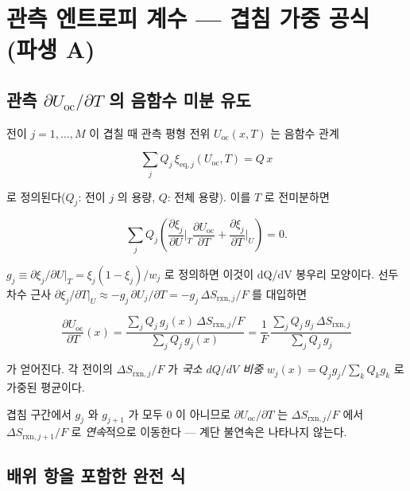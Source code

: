 \documentclass[11pt,a4paper]{article}
\newcommand{\rxn}{\mathrm{rxn}}
\newcommand{\eq}{\mathrm{eq}}
\newcommand{\oc}{\mathrm{oc}}
\begin{document}
\section{관측 엔트로피 계수 — 겹침 가중 공식 (파생 A)}\label{sec:mixing}

\subsection{관측 $\partial U_\oc/\partial T$ 의 음함수 미분 유도}

전이 $j = 1, \ldots, M$ 이 겹칠 때 관측 평형 전위 $U_\oc(x,T)$ 는 음함수 관계

\begin{equation}
  \sum_j Q_j\,\xi_{\eq,j}(U_\oc, T) = Q\,x
  \label{eq:implicit}
\end{equation}

로 정의된다($Q_j$: 전이 $j$ 의 용량, $Q$: 전체 용량). 이를 $T$ 로 전미분하면

\begin{equation}
  \sum_j Q_j\left(\frac{\partial\xi_j}{\partial U}\bigg|_T \frac{\partial U_\oc}{\partial T}
  + \frac{\partial\xi_j}{\partial T}\bigg|_U\right) = 0.
  \label{eq:totalderiv}
\end{equation}

$g_j \equiv \partial\xi_j/\partial U|_T = \xi_j(1-\xi_j)/w_j$ 로 정의하면
이것이 dQ/dV 봉우리 모양이다. 선두 차수 근사
$\partial\xi_j/\partial T|_U \approx -g_j\,\partial U_j/\partial T = -g_j\,\Delta S_{\rxn,j}/F$
를 대입하면

\begin{equation}
  \boxed{\;
    \frac{\partial U_\oc}{\partial T}(x)
    = \frac{\sum_j Q_j\,g_j(x)\,\Delta S_{\rxn,j}/F}{\sum_j Q_j\,g_j(x)}
    = \frac{1}{F}\,\frac{\sum_j Q_j\,g_j\,\Delta S_{\rxn,j}}{\sum_j Q_j\,g_j}
  \;}
  \label{eq:weighted}
\end{equation}

가 얻어진다. 각 전이의 $\Delta S_{\rxn,j}/F$ 가 \emph{국소 $dQ/dV$ 비중} $w_j(x) = Q_j g_j / \sum_k Q_k g_k$
로 가중된 평균이다.

겹침 구간에서 $g_j$ 와 $g_{j+1}$ 가 모두 0 이 아니므로 $\partial U_\oc/\partial T$ 는
$\Delta S_{\rxn,j}/F$ 에서 $\Delta S_{\rxn,j+1}/F$ 로 \emph{연속}적으로 이동한다 — 계단 불연속은 나타나지 않는다.

\subsection{배위 항을 포함한 완전 식}
\end{document}

